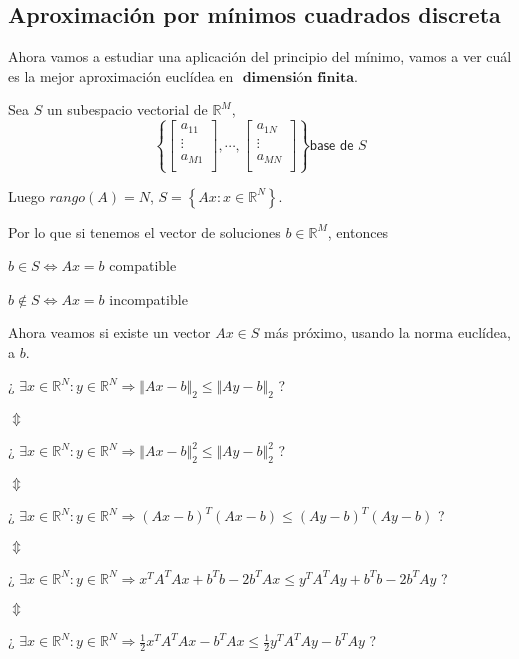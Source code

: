 \subsection{Aproximación por mínimos cuadrados discreta}
Ahora vamos a estudiar una aplicación del principio del mínimo, vamos a ver cuál es la mejor aproximación euclídea en $\textbf{ dimensión finita.}$

Sea $S$ un subespacio vectorial de $\mathbb{R}^M$,
$$
\left\lbrace
\begin{bmatrix}
a_{11} \\
\vdots \\
a_{M1} \\
\end{bmatrix}
, \cdots,
\begin{bmatrix}
a_{1N} \\
\vdots \\
a_{MN} \\
\end{bmatrix}
\right\rbrace
\textsf{base de } S
$$

Luego $rango(A) = N$, $S = \left\lbrace Ax : x \in \mathbb{R}^N \right\rbrace$.

Por lo que si tenemos el vector de soluciones $b \in \mathbb{R}^M$, entonces
	\begin{nlist}
		\item $b \in S \Leftrightarrow Ax = b $ compatible
		\item $b \notin S \Leftrightarrow Ax = b $ incompatible
	\end{nlist}
	
Ahora veamos si existe un vector $Ax \in S$ más próximo, usando la norma euclídea, a $b$.

¿ $\exists x \in \mathbb{R}^N : y \in \mathbb{R}^N \Rightarrow \Vert Ax-b \Vert _2 \leq \Vert Ay-b \Vert _2$ ?

$\Updownarrow$

¿ $\exists x \in \mathbb{R}^N : y \in \mathbb{R}^N \Rightarrow \Vert Ax-b \Vert _2^2 \leq \Vert Ay-b \Vert _2^2$ ?

$\Updownarrow$

¿ $\exists x \in \mathbb{R}^N : y \in \mathbb{R}^N \Rightarrow (Ax-b)^T (Ax-b) \leq (Ay-b)^T(Ay-b) $ ?

$\Updownarrow$

¿ $\exists x \in \mathbb{R}^N : y \in \mathbb{R}^N \Rightarrow x^TA^TAx+b^Tb-2b^TAx \leq y^TA^TAy+b^Tb-2b^TAy $ ?

$\Updownarrow$

¿ $\exists x \in \mathbb{R}^N : y \in \mathbb{R}^N \Rightarrow \frac{1}{2} x^TA^TAx - b^TAx \leq \frac{1}{2} y^TA^TAy - b^TAy $ ?

